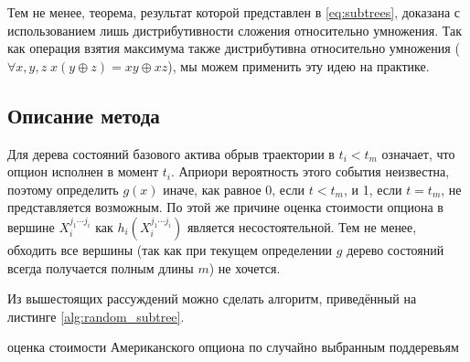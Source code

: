 Тем не менее, теорема, результат которой представлен в \eqref{eq:subtrees}, доказана с использованием лишь дистрибутивности сложения относительно умножения. Так как операция взятия максимума также дистрибутивна относительно умножения ($\forall x,y,z \; x(y\oplus z) = xy\oplus xz$), мы можем применить эту идею на практике.

\subsection{Описание метода}
Для дерева состояний базового актива обрыв траектории в $t_i < t_m$ означает, что опцион исполнен в момент $t_i$. Априори вероятность этого события неизвестна, поэтому определить $g(x)$ иначе, как равное 0, если $t < t_m$, и 1, если $t = t_m$, не представляется возможным. По этой же причине оценка стоимости опциона в вершине $X_i^{j_1\cdots j_i}$ как $h_i\left(X_i^{j_1\cdots j_i}\right)$ является несостоятельной. Тем не менее, обходить все вершины (так как при текущем определении $g$ дерево состояний всегда получается полным длины $m$) не хочется.

Из вышестоящих рассуждений можно сделать алгоритм, приведённый на листинге \ref{alg:random_subtree}.
\IncMargin{1em}
\begin{algorithm}
  \caption{оценка стоимости Американского опциона по случайно выбранным поддеревьям}\label{alg:random_subtree}
\end{algorithm}\DecMargin{1em}

